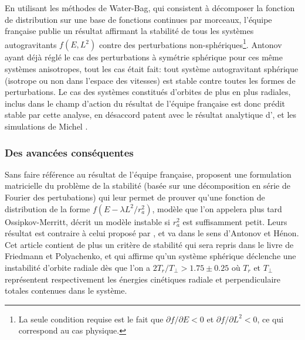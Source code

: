 En utilisant les méthodes de Water-Bag, qui consistent à décomposer la fonction de distribution sur une base de fonctions continues par morceaux,
l'équipe française \cite{waterbag} publie un résultat affirmant la stabilité de tous les systèmes autogravitants $f\left(  E,L^{2}\right)  $ contre
des perturbations non-sphériques\footnote{La seule condition requise est le fait que $\partial f/\partial E<0$ et $\partial f/\partial L^{2}<0$, ce
qui correspond au cas physique.}. Antonov ayant déjà réglé le cas des perturbations à symétrie sphérique pour ces même systèmes anisotropes, tout les
cas était fait: tout système autogravitant sphérique (isotrope ou non dans l'espace des vitesses) est stable contre toutes les formes de
perturbations. Le cas des systèmes constitués d'orbites de plus en plus radiales, inclus dans le champ d'action du résultat de l'équipe française est
donc prédit stable par cette analyse, en désaccord patent avec le résultat analytique d'\cite{antonov}, et les simulations de Michel \cite{henon}.

\subsubsection{Des avancées conséquentes\label{roiadvances}}

Sans faire référence au résultat de l'équipe française, \citet{polyach} proposent une formulation matricielle du problème de
la stabilité (basée sur une décomposition en série de Fourier des pertubations) qui leur permet de prouver qu'une fonction de distribution de la forme
$f\left(  E-\lambda L^{2}/r_{a}^{2}\right)$, modèle que l'on appelera plus tard Ossipkov-Merritt, décrit un modèle instable si $r_{a}^{2}$ est
suffisamment petit. Leurs résultat est contraire à celui proposé par \cite{waterbag}, et va dans
le sens d'Antonov et Hénon. Cet article contient de plus un critère de stabilité qui sera repris dans le livre de Friedmann et Polyachenko, et qui
affirme qu'un système sphérique déclenche une instabilité d'orbite radiale dès que l'on a $2T_{r}/T_{\perp}>1.75\pm0.25$ o\`{u} $T_{r}$ et
$T_{\perp}$ représentent respectivement les énergies cinétiques radiale et perpendiculaire totales contenues dans le système.

